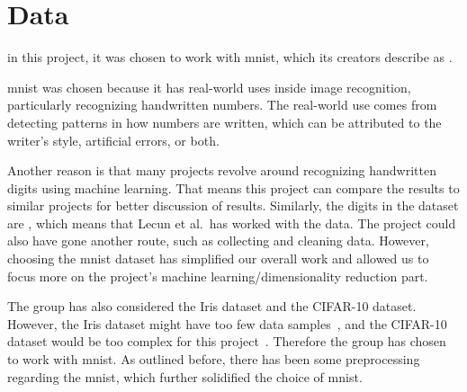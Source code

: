 \section{Data}\label{sec:data}
in this project, it was chosen to work with \gls{mnist}, which its creators describe as .

\gls{mnist} was chosen because it has real-world uses inside image recognition, particularly recognizing handwritten numbers. The real-world use comes from detecting patterns in how numbers are written, which can be attributed to the writer's style, artificial errors, or both.

Another reason is that many projects revolve around recognizing handwritten digits using machine learning. That means this project can compare the results to similar projects for better discussion of results. Similarly, the digits in the dataset are , which means that Lecun et al.\ has worked with the data. The project could also have gone another route, such as collecting and cleaning data. However, choosing the \gls{mnist} dataset has simplified our overall work and allowed us to focus more on the project's machine learning/dimensionality reduction part. 

The group has also considered the Iris dataset and the CIFAR-10 dataset. However, the Iris dataset might have too few data samples~\cite{mnist-vs-iris}, and the CIFAR-10 dataset would be too complex for this project~\cite{datasets-uniqtech}. Therefore the group has chosen to work with \gls{mnist}. As outlined before, there has been some preprocessing regarding the \gls{mnist}, which further solidified the choice of \gls{mnist}.